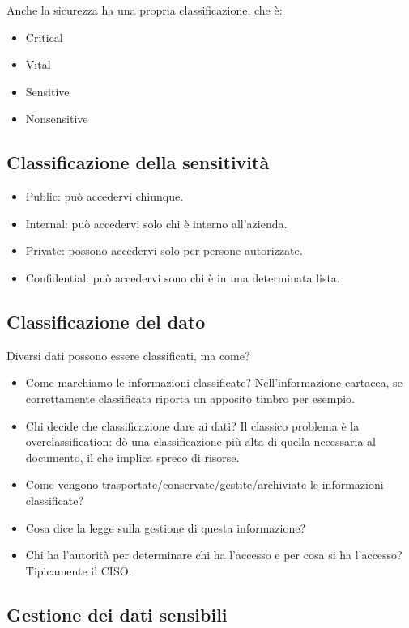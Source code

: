 Anche la sicurezza ha una propria classificazione, che è:
\begin{itemize}
  \item Critical
  \item Vital
  \item Sensitive
  \item Nonsensitive
\end{itemize}

\subsection{Classificazione della sensitività}

\begin{itemize}
\item Public: può accedervi chiunque.
\item Internal: può accedervi solo chi è interno all'azienda.
\item Private: possono accedervi solo per persone autorizzate.
\item Confidential: può accedervi sono chi è in una determinata lista.
\end{itemize}

\subsection{Classificazione del dato}

Diversi dati possono essere classificati, ma come?

\begin{itemize}
\item Come marchiamo le informazioni classificate? Nell'informazione cartacea,
se correttamente classificata riporta un apposito timbro per esempio.
\item Chi decide che classificazione dare ai dati? Il classico problema è la
overclassification: dò una classificazione più alta di quella necessaria al
documento, il che implica spreco di risorse.
\item Come vengono trasportate/conservate/gestite/archiviate le informazioni
classificate?
\item Cosa dice la legge sulla gestione di questa informazione?
\item Chi ha l'autorità per determinare chi ha l'accesso e per cosa si ha
l'accesso? Tipicamente il CISO.
\end{itemize}

\subsection{Gestione dei dati sensibili}

